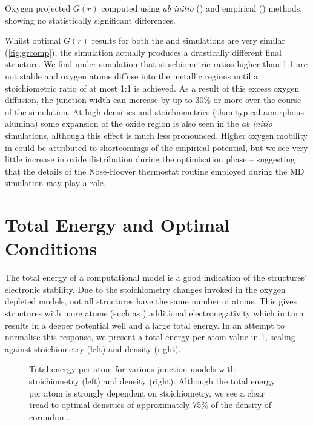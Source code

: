 \phantom{push marginfigure}
\begin{marginfigure}
\resizebox{\marginparwidth}{!}{}
\caption[Radial Distribution Function Comparison]{\label{fig:grcomp}Oxygen projected $G(r)$ computed using \textit{ab initio} ()  and empirical ()  methods, showing no statistically significant differences.}
\end{marginfigure}
\vspace{-1em}
Whilst optimal $G(r)$ results for both the  and  simulations are very similar (\cref{fig:grcomp}), the  simulation actually produces a drastically different final structure.
We find under  simulation that stoichiometric ratios higher than 1:1 are not stable and oxygen atoms diffuse into the metallic regions until a stoichiometric ratio of at most 1:1 is achieved.
As a result of this excess oxygen diffusion, the junction width can increase by up to 30\% or more over the course of the simulation.
At high densities and stoichiometries (than typical amorphous alumina) some expansion of the oxide region is also seen in the \textit{ab initio} simulations, although this effect is much less pronounced.
Higher oxygen mobility in  could be attributed to shortcomings of the empirical potential, but we see very little increase in oxide distribution during the optimisation phase -- suggesting that the details of the Nos\'{e}-Hoover thermostat routine employed during the MD simulation may play a role.

\section{Total Energy and Optimal Conditions}
The total energy of a computational model is a good indication of the structures' electronic stability.
Due to the stoichiometry changes invoked in the oxygen depleted models, not all structures have the same number of atoms.
This gives structures with more atoms (such as ) additional electronegativity which in turn results in a deeper potential well and a large total energy.
In an attempt to normalise this response, we present a total energy per atom value in \cref{fig:energyperatom}, scaling against stoichiometry (left) and density (right).

\begin{figure}[tbp]
\peratommargins
\begin{adjustwidth}{\peratomleft}{\peratomright}
\resizebox{\widefigure}{!}{}
\caption[Energy Comparisons]{\label{fig:energyperatom}Total energy per atom for various junction models with stoichiometry (left) and density (right).  Although the total energy per atom is strongly dependent on stoichiometry, we see a clear tread to optimal densities of approximately 75\% of the density of corundum.}
\end{adjustwidth}
\end{figure}

